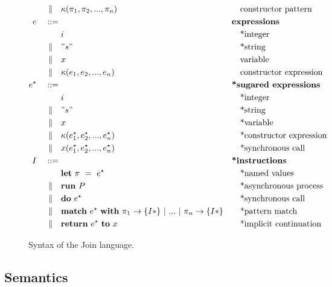 \begin{figure}
\begin{align*}
\mid\kern-1pt\mid\quad& \kappa(\pi_1, \pi_2, ..., \pi_n)
                           && \quad\textrm{constructor pattern} \\
e\quad ::={}&              && \textbf{expressions} \\
         & i               && \quad\textrm{*integer} \\
\mid\kern-1pt\mid\quad& " s "         && \quad\textrm{*string} \\
\mid\kern-1pt\mid\quad& x               && \quad\textrm{variable} \\
\mid\kern-1pt\mid\quad& \kappa(e_1, e_2, ..., e_n)
                           && \quad\textrm{constructor expression} \\
e^\star\quad ::={}&         && \textbf{*sugared expressions} \\
         & i               && \quad\textrm{*integer} \\
\mid\kern-1pt\mid\quad& " s "         && \quad\textrm{*string} \\
\mid\kern-1pt\mid\quad& x               && \quad\textrm{*variable} \\
\mid\kern-1pt\mid\quad& \kappa(e^\star_1, e^\star_2, ..., e^\star_n)
                           && \quad\textrm{*constructor expression} \\
\mid\kern-1pt\mid\quad& x(e^\star_1, e^\star_2, ..., e^\star_ n)
                           && \quad\textrm{*synchronous call} \\
I\quad ::={}&              && \textbf{*instructions} \\
         & \mathbf{let}~\pi~=~e^\star
                           && \quad\textrm{*named values} \\
\mid\kern-1pt\mid\quad& \mathbf{run}~P  && \quad\textrm{*asynchronous process} \\
\mid\kern-1pt\mid\quad& \mathbf{do}~e^\star && \quad\textrm{*synchronous call} \\
\mid\kern-1pt\mid\quad& \textbf{match}~e^\star~\textbf{with}~\pi_1
               \rightarrow \{ I* \} ~|~ ... ~|~ \pi_n \rightarrow \{ I* \}
                           && \quad\textrm{*pattern match} \\
\mid\kern-1pt\mid\quad& \textbf{return}~e^\star~\textbf{to}~x
                           && \quad\textrm{*implicit continuation}
\end{align*}
\caption{Syntax of the Join language.\label{fig:syntax}}
\end{figure}


\subsection{Semantics}

